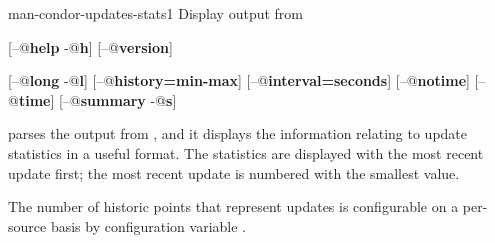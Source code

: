 \begin{ManPage}{}{man-condor-updates-stats}{1}
{Display output from }


\Synopsis {}
[\verb@--@\textbf{help} \Bar{} \verb@-@\textbf{h}] \Bar{} [\verb@--@\textbf{version}]

[\verb@--@\textbf{long} \Bar{} \verb@-@\textbf{l}]
[\verb@--@\textbf{history=\lt{}min\gt{}-\lt{}max\gt{}}]
[\verb@--@\textbf{interval=\lt{}seconds\gt{}}]
[\verb@--@\textbf{notime}]
[\verb@--@\textbf{time}]
[\verb@--@\textbf{summary} \Bar{} \verb@-@\textbf{s}]





\Description 

 parses the output from ,
and it displays the information relating to update statistics
in a useful format.
The statistics are displayed with the most recent update first;
the most recent update is numbered with the smallest value.

The number of historic points that represent updates is
configurable on a per-source basis by configuration variable
.


\end{ManPage}
